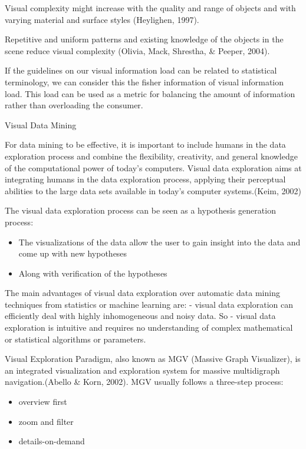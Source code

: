 \documentclass[print]{nuthesis}
\providecommand{\tightlist}{%
  \setlength{\itemsep}{0pt}\setlength{\parskip}{0pt}}
\begin{document}
Visual complexity might increase with the quality and range of objects and with varying material and surface styles (Heylighen, 1997).

Repetitive and uniform patterns and existing knowledge of the objects in the scene reduce visual complexity (Olivia, Mack, Shrestha, \& Peeper, 2004).

If the guidelines on our visual information load can be related to statistical terminology, we can consider this the fisher information of visual information load. This load can be used as a metric for balancing the amount of information rather than overloading the consumer.

Visual Data Mining

For data mining to be effective, it is important to include humans in the data exploration process and combine the flexibility, creativity, and general knowledge of the computational power of today's computers. Visual data exploration aims at integrating humans in the data exploration process, applying their perceptual abilities to the large data sets available in today's computer systems.(Keim, 2002)

The visual data exploration process can be seen as a hypothesis generation process:

\begin{itemize}
\tightlist
\item
  The visualizations of the data allow the user to gain insight into the data and come up with new hypotheses
\item
  Along with verification of the hypotheses
\end{itemize}

The main advantages of visual data exploration over automatic data mining techniques from statistics or machine learning are:
- visual data exploration can efficiently deal with highly inhomogeneous and noisy data.
So - visual data exploration is intuitive and requires no understanding of complex mathematical or statistical algorithms or parameters.

Visual Exploration Paradigm, also known as MGV (Massive Graph Visualizer), is an integrated visualization and exploration system for massive multidigraph navigation.(Abello \& Korn, 2002). MGV usually follows a three-step process:

\begin{itemize}
\tightlist
\item
  overview first
\item
  zoom and filter
\item
  details-on-demand
\end{itemize}
\end{document}

